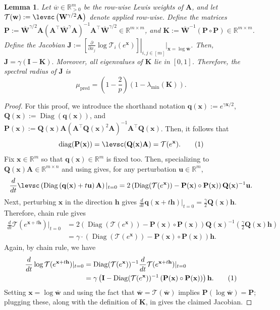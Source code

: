 \documentclass[11pt]{article}
\newcommand\numberthis{\addtocounter{equation}{1}\tag{\theequation}}
\theoremstyle{plain}
\newtheorem{lemma}[lemma]{Lemma}
\numberwithin{equation}{section}
\newcommand{\R}{\mathbb{R}}
\newcommand{\diag}{\operatorname{diag}}
\newcommand{\Diag}{\operatorname{Diag}}
\newcommand{\Rmspos}{\mathbb{R}^m_{>0}}
\newcommand{\bA}{\mathbf{A}}
\newcommand{\bI}{\mathbf{I}}
\newcommand{\bJ}{\mathbf{J}}
\newcommand{\bK}{\mathbf{K}}
\newcommand{\bP}{\mathbf{P}}
\newcommand{\bq}{\mathbf{q}}
\newcommand{\bQ}{\mathbf{Q}}
\newcommand{\bW}{\mathbf{W}}
\newcommand{\bh}{\mathbf{h}}
\newcommand{\bw}{\mathbf{w}}
\newcommand{\bx}{\mathbf{x}}
\newcommand{\bu}{\mathbf{u}}
\newcommand{\bwbar}{\overline{\mathbf{w}}}
\newcommand{\wbar}{\overline{w}}
\newcommand{\bWbar}{\overline{\mathbf{W}}}
\newcommand{\calT}{\mathcal{T}}
\newcommand{\omrp}{\gamma}
\begin{document}
\begin{lemma}\label{lem:local-dyn} Let  $\wbar\in\Rmspos$ be the row-wise Lewis weights of $\bA$, and let $\calT(\bw):=\levsc\left(\bW^{\omrp/2}\bA\right)$ denote  applied row-wise. Define the  matrices $\bP:= \bWbar^{\omrp/2}\bA\left(\bA^\top \bWbar^\omrp \bA\right)^{-1}\bA^\top\bWbar^{\omrp/2}\in\R^{m\times m}$, and $\bK:= \bWbar^{-1}(\bP\circ\bP) \in\R^{m \times m}$. Define the Jacobian $\bJ:= \left.\left[\frac{\partial}{\partial x_j}\log\calT_i(e^{\bx})\right]\right|_{i, j\in [m]}\lvert_{\bx = \log\bwbar}$. Then, $\bJ = \omrp(\bI-\bK).$ Moreover, all eigenvalues of $\bK$ lie in $[0,1]$. Therefore, the spectral radius of $\bJ$ is
\[
\mu_{\mathrm{pred}}
=
\left(1-\frac{2}{p}\right)
\left(1-\lambda_{\min}(\bK)\right).
\]
\end{lemma}
\begin{proof}
For this proof, we introduce the shorthand notation  $\bq(\bx):= e^{\omrp \bx/2}$,   $\bQ(\bx):= \Diag(\bq(\bx))$, and $\bP(\bx):= \bQ(\bx)\bA\left(\bA^\top\bQ(\bx)^2\bA\right)^{-1}\bA^\top \bQ(\bx)$. Then, it follows that \[\diag(\bP(\bx))= \levsc(\bQ(\bx)\bA) = \calT(e^{\bx}).\numberthis\label{eq:locdyn-0}\] Fix $\bx\in\R^m$ so that $\bq(\bx)\in\R^m$ is fixed too. Then, specializing \cite[Lemma~49]{lee2019solving} to $\bQ(\bx)\bA\in\R^{m\times n}$ and using  gives, for any perturbation $\bu\in\R^m$, \[\frac{d}{dt} \levsc\left(\Diag\left(\bq(\bx) + t\bu\right)\bA\right)|_{t=0} = 2\left(\Diag(\calT(e^{\bx})) - \bP(\bx)\circ\bP(\bx) \right)\bQ(\bx)^{-1}\bu.\]Next, perturbing $\bx$ in the direction $\bh$ gives $\frac{d}{dt}\bq(\bx+t\bh)|_{t=0} = \frac{\omrp}{2}\bQ(\bx)\bh.$ 
Therefore,  chain rule gives \begin{align*}\frac{d}{dt}\calT(e^{\bx+t\bh})|_{t=0} &= 2\left(\Diag(\calT(e^{\bx})) - \bP(\bx)\circ\bP(\bx)\right)\bQ(\bx)^{-1}\left(\frac{\omrp}{2}\bQ(\bx)\bh\right)\\ 
&= \omrp\cdot\left(\Diag(\calT(e^{\bx})) - \bP(\bx)\circ\bP(\bx)\right)\bh. 
\end{align*} Again, by chain rule, we have \begin{align*}
\frac{d}{dt}\log\calT(e^{\bx+t\bh})|_{t=0} &= \Diag(\calT(e^{\bx}))^{-1}\frac{d}{dt}\calT(e^{\bx+t\bh})|_{t=0}\\ 
&= \omrp\left(\bI- \Diag(\calT(e^{\bx}))^{-1}\left(\bP(\bx)\circ\bP(\bx)\right)\right)\bh.\numberthis\label{eq:locdyn-2}\end{align*} Setting $\bx=\log\bwbar$ and using the fact that $\bwbar=\calT(\bwbar)$ implies $\bP(\log\bwbar)= \bP$; plugging these, along with the definition of $\bK$, in  gives the claimed Jacobian. 


\end{proof}
\end{document}
